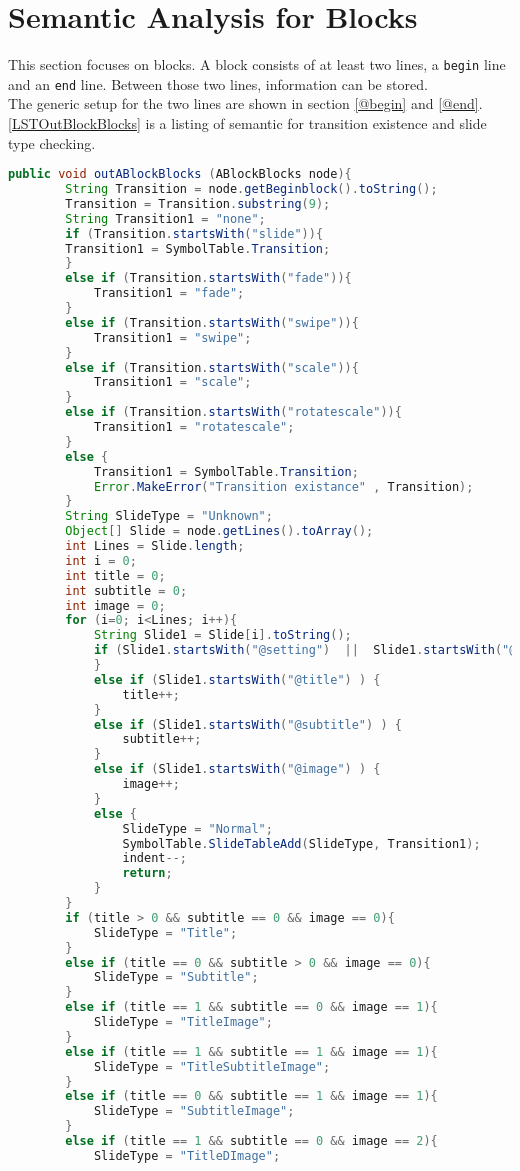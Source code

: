 \section{Semantic Analysis for Blocks}
This section focuses on blocks. A block consists of at least two lines, a \texttt{begin} line and an \texttt{end} line. Between those two lines, information can be stored. \\
The generic setup for the two lines are shown in section \ref{@begin} and \ref{@end}. \\
\ref{LSTOutBlockBlocks} is a listing of semantic for transition existence and slide type checking.
\newpage
\begin{lstlisting}[frame=single,caption=Function: OutBlockBlocks, label=LSTOutBlockBlocks, language=java]
public void outABlockBlocks (ABlockBlocks node){
		String Transition = node.getBeginblock().toString();
		Transition = Transition.substring(9);
		String Transition1 = "none";
		if (Transition.startsWith("slide")){
		Transition1 = SymbolTable.Transition;
		}
		else if (Transition.startsWith("fade")){
			Transition1 = "fade";
		}
		else if (Transition.startsWith("swipe")){
			Transition1 = "swipe";
		}
		else if (Transition.startsWith("scale")){
			Transition1 = "scale";
		}
		else if (Transition.startsWith("rotatescale")){
			Transition1 = "rotatescale";
		}
		else {
			Transition1 = SymbolTable.Transition;
			Error.MakeError("Transition existance" , Transition);
		}
		String SlideType = "Unknown";
		Object[] Slide = node.getLines().toArray();
		int Lines = Slide.length;
		int i = 0;
		int title = 0;
		int subtitle = 0;
		int image = 0;
		for (i=0; i<Lines; i++){
			String Slide1 = Slide[i].toString();
			if (Slide1.startsWith("@setting")  ||  Slide1.startsWith("@note")){
			}
			else if (Slide1.startsWith("@title") ) {
				title++;
			}
			else if (Slide1.startsWith("@subtitle") ) {
				subtitle++;
			}
			else if (Slide1.startsWith("@image") ) {
				image++;
			}
			else {
				SlideType = "Normal";
				SymbolTable.SlideTableAdd(SlideType, Transition1);
				indent--;
				return;
			}
		}
		if (title > 0 && subtitle == 0 && image == 0){
			SlideType = "Title";
		}
		else if (title == 0 && subtitle > 0 && image == 0){
			SlideType = "Subtitle";
		}
		else if (title == 1 && subtitle == 0 && image == 1){
			SlideType = "TitleImage";
		}
		else if (title == 1 && subtitle == 1 && image == 1){
			SlideType = "TitleSubtitleImage";
		}
		else if (title == 0 && subtitle == 1 && image == 1){
			SlideType = "SubtitleImage";
		}
		else if (title == 1 && subtitle == 0 && image == 2){
			SlideType = "TitleDImage";

\end{lstlisting}

